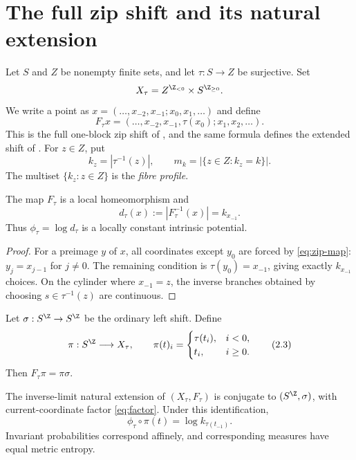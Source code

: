 \section{The full zip shift and its natural extension}\label{sec:model}

Let $S$ and $Z$ be nonempty finite sets, and let $\tau:S\to Z$ be
surjective.  Set
\[
 X_\tau=Z^{\Z_{<0}}\times S^{\Z_{\geq0}}.
\]
We write a point as
$x=(\ldots,x_{-2},x_{-1};x_0,x_1,\ldots)$ and define
\[
 F_\tau x=(\ldots,x_{-2},x_{-1},\tau(x_0);x_1,x_2,\ldots).
 \tag{2.1}\label{eq:zip-map}
\]
This is the full one-block zip shift of \citet{LameiMehdipour2025}, and the
same formula defines the extended shift of
\citet{MartinsMattosVarao2026}.  For $z\in Z$, put
\[
 k_z=|\tau^{-1}(z)|,
 \qquad m_k=|\{z\in Z:k_z=k\}|.
\]
The multiset $\{k_z:z\in Z\}$ is the \emph{fibre profile}.

\begin{lemma}\label{lem:degree}
The map $F_\tau$ is a local homeomorphism and
\[
 d_\tau(x):=|F_\tau^{-1}(x)|=k_{x_{-1}}.
 \tag{2.2}\label{eq:degree}
\]
Thus $\phi_\tau=\log d_\tau$ is a locally constant intrinsic potential.
\end{lemma}

\begin{proof}
For a preimage $y$ of $x$, all coordinates except $y_0$ are forced by
\eqref{eq:zip-map}: $y_j=x_{j-1}$ for $j\neq0$.  The remaining condition is
$\tau(y_0)=x_{-1}$, giving exactly $k_{x_{-1}}$ choices.  On the cylinder
where $x_{-1}=z$, the inverse branches obtained by choosing
$s\in\tau^{-1}(z)$ are continuous.
\end{proof}

Let $\sigma:S^\Z\to S^\Z$ be the ordinary left shift.  Define
\[
 \pi:S^\Z\longrightarrow X_\tau,
 \qquad
 \pi(t)_i=
 \begin{cases}
 \tau(t_i),&i<0,\\
 t_i,&i\geq0.
 \end{cases}
 \tag{2.3}\label{eq:factor}
\]
Then $F_\tau\pi=\pi\sigma$.

\begin{proposition}\label{prop:natural}
The inverse-limit natural extension of $(X_\tau,F_\tau)$ is conjugate to
$(S^\Z,\sigma)$, with current-coordinate factor \eqref{eq:factor}.  Under
this identification,
\[
 \phi_\tau\circ\pi(t)=\log k_{\tau(t_{-1})}.
 \tag{2.4}\label{eq:lift-potential}
\]
Invariant probabilities correspond affinely, and corresponding measures
have equal metric entropy.
\end{proposition}

